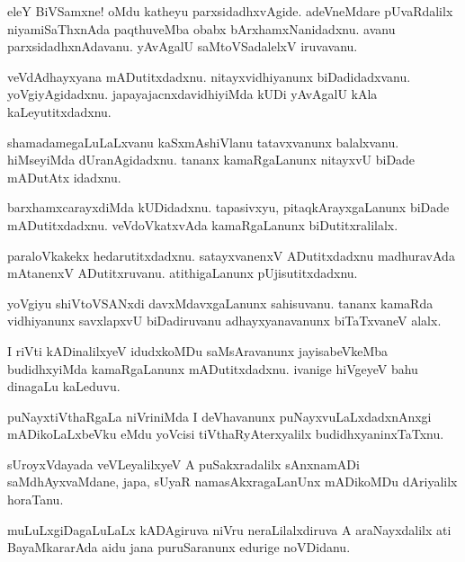 \begin{mng}
eleY BiVSamxne! oMdu katheyu parxsidadhxvAgide. adeVneMdare pUvaRdalilx niyamiSaThxnAda paqthuveMba obabx bArxhamxNanidadxnu. avanu parxsidadhxnAdavanu. yAvAgalU saMtoVSadalelxV iruvavanu.
\end{mng}

\begin{mng}
veVdAdhayxyana mADutitxdadxnu. nitayxvidhiyanunx biDadidadxvanu. yoVgiyAgidadxnu. japayajacnxdavidhiyiMda kUDi yAvAgalU kAla kaLeyutitxdadxnu.
\end{mng}

\begin{mng}
shamadamegaLuLaLxvanu kaSxmAshiVlanu tatavxvanunx balalxvanu. hiMseyiMda dUranAgidadxnu. tananx kamaRgaLanunx nitayxvU biDade mADutAtx idadxnu.
\end{mng}

\begin{mng}
barxhamxcarayxdiMda kUDidadxnu. tapasivxyu, pitaqkArayxgaLanunx biDade mADutitxdadxnu. veVdoVkatxvAda kamaRgaLanunx biDutitxralilalx.
\end{mng}

\begin{mng}
paraloVkakekx hedarutitxdadxnu. satayxvanenxV ADutitxdadxnu madhuravAda mAtanenxV ADutitxruvanu. atithigaLanunx pUjisutitxdadxnu.
\end{mng}

\begin{mng}
yoVgiyu shiVtoVSANxdi davxMdavxgaLanunx sahisuvanu. tananx kamaRda vidhiyanunx savxlapxvU biDadiruvanu adhayxyanavanunx biTaTxvaneV alalx.
\end{mng}

\begin{mng}
I riVti kADinalilxyeV idudxkoMDu saMsAravanunx jayisabeVkeMba budidhxyiMda kamaRgaLanunx mADutitxdadxnu. ivanige hiVgeyeV bahu dinagaLu kaLeduvu.
\end{mng}

\begin{mng}
puNayxtiVthaRgaLa niVriniMda I deVhavanunx puNayxvuLaLxdadxnAnxgi mADikoLaLxbeVku eMdu yoVcisi tiVthaRyAterxyalilx budidhxyaninxTaTxnu.
\end{mng}

\begin{mng}
sUroyxVdayada veVLeyalilxyeV A puSakxradalilx sAnxnamADi saMdhAyxvaMdane, japa, sUyaR namasAkxragaLanUnx mADikoMDu dAriyalilx horaTanu.
\end{mng}

\begin{mng}
muLuLxgiDagaLuLaLx kADAgiruva niVru neraLilalxdiruva A araNayxdalilx ati BayaMkararAda aidu jana puruSaranunx edurige noVDidanu.
\end{mng}

